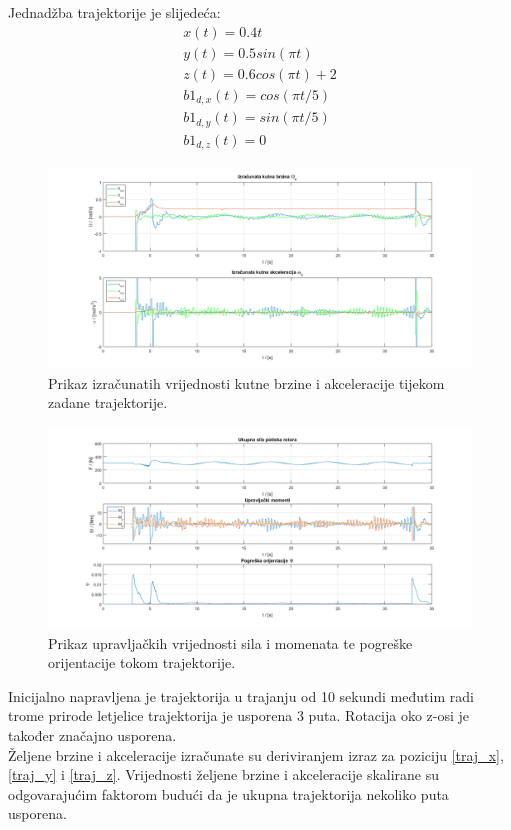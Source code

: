 \documentclass[times, utf8, diplomski, numeric]{fer}
\begin{document}
	Jednadžba trajektorije je slijedeća:
	\begin{gather}
		x(t) = 0.4t \label{traj_x}\\
		y(t) = 0.5 sin(\pi t) \label{traj_y}\\
		z(t) = 0.6 cos(\pi t) + 2 \label{traj_z}\\
		b1_{d,x}(t) = cos(\pi t / 5) \\
		b1_{d,y}(t) = sin(\pi t / 5) \\
		b1_{d,z}(t) = 0
	\end{gather}
	\begin{figure}[h!]
		\includegraphics[width=\textwidth]{plots/traj_alpha_omega2.png}
		\caption{Prikaz izračunatih vrijednosti kutne brzine i akceleracije tijekom zadane trajektorije.}
	\end{figure}
	
	\begin{figure}[h!]
		\includegraphics[width=\textwidth]{plots/traj_force_moments2.png}
		\caption{Prikaz upravljačkih vrijednosti sila i momenata te pogreške orijentacije tokom trajektorije.}
	\end{figure}
	
	Inicijalno napravljena je trajektorija u trajanju od 10 sekundi međutim radi trome prirode letjelice trajektorija je usporena 3 puta. Rotacija oko z-osi je također značajno usporena.\\
	Željene brzine i akceleracije izračunate su deriviranjem izraz za poziciju \ref{traj_x}, \ref{traj_y} i \ref{traj_z}. Vrijednosti željene brzine i akceleracije skalirane su odgovarajućim faktorom budući da je ukupna trajektorija nekoliko puta usporena.
	
\end{document}
